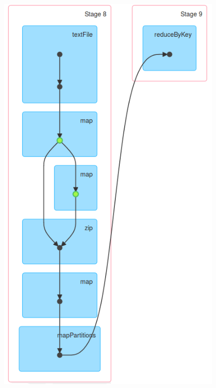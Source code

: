 \documentclass{l4proj}
\begin{document}
\begin{figure}[H]
\centering
\begin{minipage}{.5\textwidth}
  \centering
  \includegraphics[width=.7\linewidth]{images/DAG1}
  \label{fig:dag1}
\end{minipage}%
\begin{minipage}{.5\textwidth}
  \centering

\end{minipage}
\end{figure}
\end{document}
